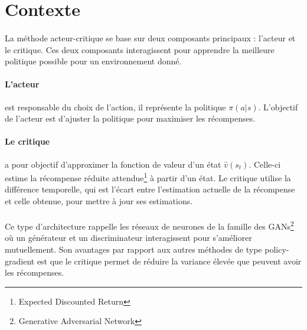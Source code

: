 \section{Contexte}

\paragraph{}
La méthode acteur-critique se base sur deux composants principaux : l'acteur et le critique. 
Ces deux composants interagissent pour apprendre la meilleure politique possible pour un environnement donné.

\vspace{-0.2cm}
\paragraph{L'acteur} est responsable du choix de l'action, il représente la politique $\pi(a|s)$. 
L'objectif de l'acteur est d'ajuster la politique pour maximiser les récompenses.

\vspace{-0.2cm}
\paragraph{Le critique} a pour objectif d'approximer la fonction de valeur d'un état $\hat{v}(s_t)$. 
Celle-ci estime la récompense réduite attendue\footnote{Expected Discounted Return} à partir d'un état.
Le critique utilise la différence temporelle, 
qui est l'écart entre l'estimation actuelle de la récompense et celle obtenue, pour mettre à jour ses estimations.

\vspace{-0.2cm}
\paragraph{}
Ce type d'architecture rappelle les réseaux de neurones de la famille des GANs\footnote{Generative Adversarial Network} 
où un générateur et un discriminateur interagissent pour s'améliorer mutuellement. Son avantages par rapport aux autres méthodes de type
policy-gradient est que le critique permet de réduire la variance élevée que peuvent avoir les récompenses.

